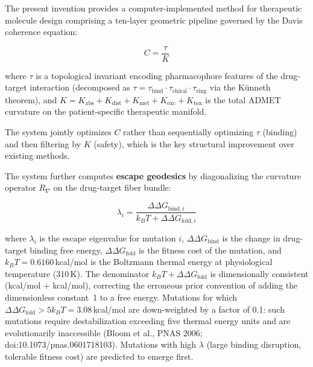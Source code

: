 \documentclass[11pt]{article}
\begin{document}
The present invention provides a computer-implemented method for therapeutic molecule design
comprising a ten-layer geometric pipeline governed by the Davis coherence equation:

\begin{equation}\label{eq:coherence}
C = \frac{\tau}{K}
\end{equation}

\noindent where $\tau$ is a topological invariant encoding pharmacophore features of the
drug-target interaction (decomposed as $\tau = \tau_{\text{bind}} \cdot \tau_{\text{chiral}}
\cdot \tau_{\text{ring}}$ via the K\"unneth theorem), and $K = K_{\text{abs}} +
K_{\text{dist}} + K_{\text{met}} + K_{\text{exc}} + K_{\text{tox}}$ is the total ADMET
curvature on the patient-specific therapeutic manifold.

The system jointly optimizes $C$ rather than sequentially optimizing $\tau$ (binding) and
then filtering by $K$ (safety), which is the key structural improvement over existing methods.

The system further computes \textbf{escape geodesics} by diagonalizing the curvature operator
$R_\nabla$ on the drug-target fiber bundle:

\begin{equation}\label{eq:escape}
\lambda_i = \frac{\Delta\Delta G_{\text{bind},i}}{k_BT + \Delta\Delta G_{\text{fold},i}}
\end{equation}

\noindent where $\lambda_i$ is the escape eigenvalue for mutation $i$,
$\Delta\Delta G_{\text{bind}}$ is the change in drug-target binding free energy,
$\Delta\Delta G_{\text{fold}}$ is the fitness cost of the mutation, and
$k_BT = 0.6160$\,kcal/mol is the Boltzmann thermal energy at physiological temperature
(310\,K). The denominator $k_BT + \Delta\Delta G_{\text{fold}}$ is dimensionally consistent
(kcal/mol + kcal/mol), correcting the erroneous prior convention of adding the dimensionless
constant~1 to a free energy. Mutations for which $\Delta\Delta G_{\text{fold}} > 5k_BT =
3.08$\,kcal/mol are down-weighted by a factor of 0.1: such mutations require destabilization
exceeding five thermal energy units and are evolutionarily inaccessible
(Bloom et al., PNAS 2006; doi:10.1073/pnas.0601718103). Mutations with high
$\lambda$ (large binding disruption, tolerable fitness cost) are predicted to emerge first.

\end{document}
